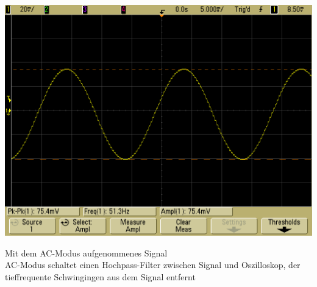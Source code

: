 \documentclass[compress,11pt]{beamer}
\begin{document}
\includegraphics[width=\textwidth]{../daten/scope_22}

Mit dem AC-Modus aufgenommenes Signal\\
AC-Modus schaltet einen Hochpass-Filter zwischen Signal und Oszilloskop, der tieffrequente Schwingingen aus dem Signal entfernt
\end{document}
